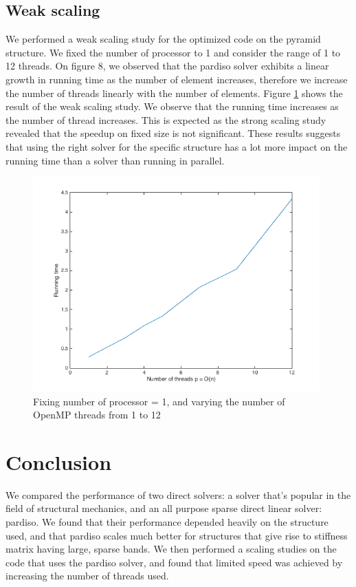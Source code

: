 \documentclass[11pt]{article}
\begin{document}
\subsection{Weak scaling}
We performed a weak scaling study for the optimized code on the pyramid structure. We fixed the number of processor to 1 and consider the range of 1 to 12 threads. On figure 8, we observed that the pardiso solver exhibits a linear growth in running time as the number of element increases, therefore we increase the number of threads linearly with the number of elements. Figure \ref{fig:weakplot} shows the result of the weak scaling study. We observe that the running time increases as the number of thread increases. This is expected as the strong scaling study revealed that the speedup on fixed size is not significant. These results suggests that using the right solver for the specific structure has a lot more impact on the running time than a solver than running in parallel.

\begin{figure}[H]
	\begin{center}
		\includegraphics[width=11cm]{weakplot}
		\caption{Fixing number of processor = 1, and varying the number of OpenMP threads from 1 to 12 }
		\label{fig:weakplot}
	\end{center}
\end{figure}

\section{Conclusion}\label{sec:conclusion}
We compared the performance of two direct solvers: a solver that's popular in the field of structural mechanics, and an all purpose sparse direct linear solver: pardiso. We found that their performance depended heavily on the structure used, and that pardiso scales much better for structures that give rise to stiffness matrix having large, sparse bands. We then performed a scaling studies on the code that uses the pardiso solver, and found that limited speed was achieved by increasing the number of threads used. 
\end{document}
